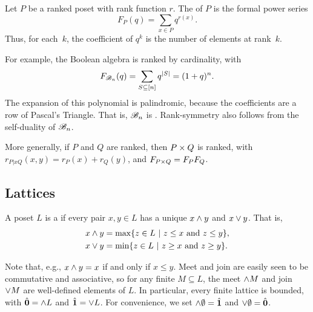 \begin{definition} Let $P$ be a ranked poset with rank function $r$.
The  of $P$ is the formal power series
\[F_P(q) = \sum_{x\in P} q^{r(x)}.\]
Thus, for each~$k$, the coefficient of $q^k$ is the number of elements at rank~$k$.
\end{definition}

For example, the Boolean algebra is ranked by cardinality, with
\[F_{\mathscr{B}_n}(q) = \sum_{S\subseteq[n]} q^{|S|} = (1+q)^n.\]
The expansion of this polynomial is palindromic, because the 
coefficients are a row of Pascal's Triangle.  That is, $\mathscr{B}_n$ is 
.  Rank-symmetry also follows from the self-duality of $\mathscr{B}_n$.

More generally, if $P$ and $Q$ are ranked, then $P\times Q$ is ranked, with $r_{P|x Q}(x,y)=r_P(x)+r_Q(y)$, and $F_{P\times Q}=F_PF_Q$.

\subsection{Lattices}

\begin{definition} A poset $L$ is a  if every pair $x,y\in L$ has a unique  $x\wedge y$ and  $x\vee y$.  That is,
\begin{align*}
x\wedge y &= \max\{z\in L ~|~ z\leq x \text{ and } z\leq y\},\\
x\vee y &= \min\{z\in L ~|~ z\geq x \text{ and } z\geq y\}.
\end{align*}
\end{definition}

Note that, e.g., $x\wedge y=x$ if and only if $x\leq y$.  Meet and join are easily seen to be commutative and associative, so for any finite $M\subseteq L$, the meet $\wedge M$ and join $\vee M$ are well-defined elements of $L$.  In particular, every finite lattice is bounded, with $\hat{\mathbf{0}}=\wedge L$ and $\hat{\mathbf{1}}=\vee L$.  For convenience, we set $\wedge\emptyset=\hat{\mathbf{1}}$ and $\vee\emptyset=\hat{\mathbf{0}}$.

